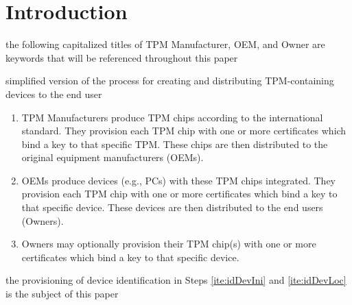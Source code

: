 \chapter{Introduction}



the following capitalized titles of TPM Manufacturer, OEM, and Owner are keywords that will be referenced throughout this paper

simplified version of the process for creating and distributing TPM-containing devices to the end user

\begin{enumerate}
  \item\label{ite:idTPM} TPM Manufacturers produce TPM chips according to the international standard. They provision each TPM chip with one or more certificates which bind a key to that specific TPM. These chips are then distributed to the original equipment manufacturers (OEMs).
  \item\label{ite:idDevIni} OEMs produce devices (e.g., PCs) with these TPM chips integrated. They provision each TPM chip with one or more certificates which bind a key to that specific device. These devices are then distributed to the end users (Owners).
  \item\label{ite:idDevLoc} Owners may optionally provision their TPM chip(s) with one or more certificates which bind a key to that specific device.
\end{enumerate} 

the provisioning of device identification in Steps \ref{ite:idDevIni} and \ref{ite:idDevLoc} is the subject of this paper